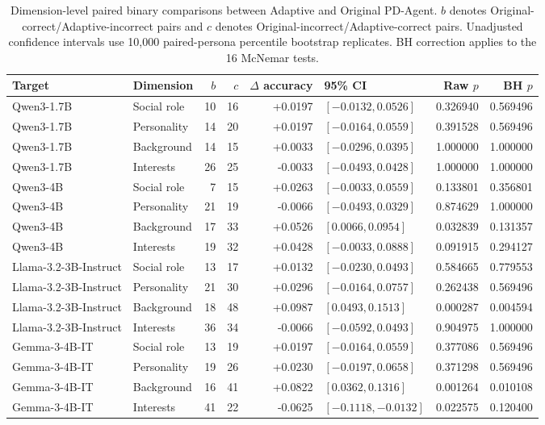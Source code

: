 \documentclass{ieeeaccess}
\begin{document}
\begin{table}[H]
\caption{Dimension-level paired binary comparisons between Adaptive and Original PD-Agent. $b$ denotes Original-correct/Adaptive-incorrect pairs and $c$ denotes Original-incorrect/Adaptive-correct pairs. Unadjusted confidence intervals use 10,000 paired-persona percentile bootstrap replicates. BH correction applies to the 16 McNemar tests.}
\label{tab:dimension-level-tests}
\centering
\footnotesize
\begin{tabular*}{\textwidth}{@{\extracolsep{\fill}}llrrrlrr@{}}
\hline
Target & Dimension & $b$ & $c$ & $\Delta$ accuracy & 95\% CI & Raw $p$ & BH $p$ \\
\hline
Qwen3-1.7B & Social role & 10 & 16 & +0.0197 & $[-0.0132,0.0526]$ & 0.326940 & 0.569496 \\
Qwen3-1.7B & Personality & 14 & 20 & +0.0197 & $[-0.0164,0.0559]$ & 0.391528 & 0.569496 \\
Qwen3-1.7B & Background & 14 & 15 & +0.0033 & $[-0.0296,0.0395]$ & 1.000000 & 1.000000 \\
Qwen3-1.7B & Interests & 26 & 25 & -0.0033 & $[-0.0493,0.0428]$ & 1.000000 & 1.000000 \\
Qwen3-4B & Social role & 7 & 15 & +0.0263 & $[-0.0033,0.0559]$ & 0.133801 & 0.356801 \\
Qwen3-4B & Personality & 21 & 19 & -0.0066 & $[-0.0493,0.0329]$ & 0.874629 & 1.000000 \\
Qwen3-4B & Background & 17 & 33 & +0.0526 & $[0.0066,0.0954]$ & 0.032839 & 0.131357 \\
Qwen3-4B & Interests & 19 & 32 & +0.0428 & $[-0.0033,0.0888]$ & 0.091915 & 0.294127 \\
Llama-3.2-3B-Instruct & Social role & 13 & 17 & +0.0132 & $[-0.0230,0.0493]$ & 0.584665 & 0.779553 \\
Llama-3.2-3B-Instruct & Personality & 21 & 30 & +0.0296 & $[-0.0164,0.0757]$ & 0.262438 & 0.569496 \\
Llama-3.2-3B-Instruct & Background & 18 & 48 & +0.0987 & $[0.0493,0.1513]$ & 0.000287 & 0.004594 \\
Llama-3.2-3B-Instruct & Interests & 36 & 34 & -0.0066 & $[-0.0592,0.0493]$ & 0.904975 & 1.000000 \\
Gemma-3-4B-IT & Social role & 13 & 19 & +0.0197 & $[-0.0164,0.0559]$ & 0.377086 & 0.569496 \\
Gemma-3-4B-IT & Personality & 19 & 26 & +0.0230 & $[-0.0197,0.0658]$ & 0.371298 & 0.569496 \\
Gemma-3-4B-IT & Background & 16 & 41 & +0.0822 & $[0.0362,0.1316]$ & 0.001264 & 0.010108 \\
Gemma-3-4B-IT & Interests & 41 & 22 & -0.0625 & $[-0.1118,-0.0132]$ & 0.022575 & 0.120400 \\
\hline
\end{tabular*}
\end{table}
\end{document}
